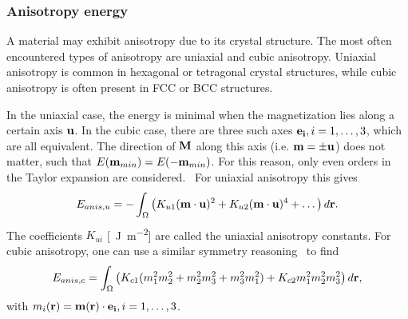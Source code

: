 \documentclass[12pt,a4paper]{article}
\begin{document}
\subsubsection{Anisotropy energy}
A material may exhibit anisotropy due to its crystal structure. The most often encountered types of anisotropy are uniaxial and cubic anisotropy. Uniaxial anisotropy is common in hexagonal or tetragonal crystal structures, while cubic anisotropy is often present in FCC or BCC structures.~\cite{Gilbert1956, abert2013discrete} \par
In the uniaxial case, the energy is minimal when the magnetization lies along a certain axis $\vb{u}$. In the cubic case, there are three such axes $\vb{e_i}, i=1,\dots,3$, which are all equivalent. The direction of $\vb{M}$ along this axis (i.e. $\vb{m}=\pm \vb{u}$) does not matter, such that $E(\vb{m}_{min}) = E(-\vb{m}_{min})$. For this reason, only even orders in the Taylor expansion are considered.~\cite{abert2013discrete} For uniaxial anisotropy this gives
\begin{equation}
    E_{anis,u} = - \int_\Omega \big(K_{u1} (\vb{m} \cdot \vb{u})^2 + K_{u2} (\vb{m} \cdot \vb{u})^4 + \dots\big) \, d\vb{r} \mathrm{.} \label{eq:Energy_Term_AnisUniaxial}
\end{equation}
The coefficients $K_{ui}$ [\SI{}{\joule\per\metre\squared}] are called the uniaxial anisotropy constants.
For cubic anisotropy, one can use a similar symmetry reasoning~\cite{abert2013discrete} to find
\begin{equation}
    E_{anis,c} = \int_\Omega \big(K_{c1} (m_1^2m_2^2 + m_2^2m_3^2 + m_3^2m_1^2) + K_{c2} m_1^2m_2^2m_3^2\big) \, d\vb{r} \mathrm{,} \label{eq:Energy_Term_AnisCubic}
\end{equation}
with $m_i(\vb{r}) = \vb{m}(\vb{r}) \cdot \vb{e_i}, i=1,\dots,3$.
\end{document}
